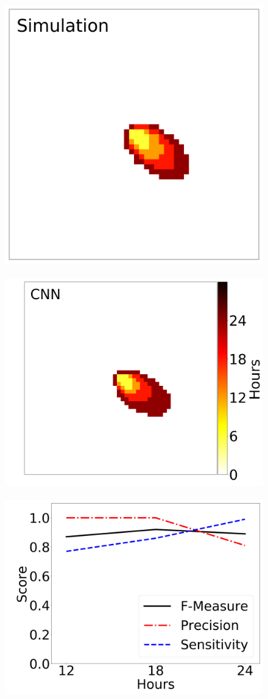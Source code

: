 \documentclass[smallcondensed]{svjour3}     %
\begin{document}
\begin{figure}[htbp]
	\includegraphics[height=0.16\textheight]{timeAnalysis_simulation2.png}
	~
	\includegraphics[height=0.16\textheight]{timeAnalysis_network2.png}
	~
	\includegraphics[height=0.16\textheight]{timeAnalysis_fmeasure2.png}

\end{figure}
\end{document}
